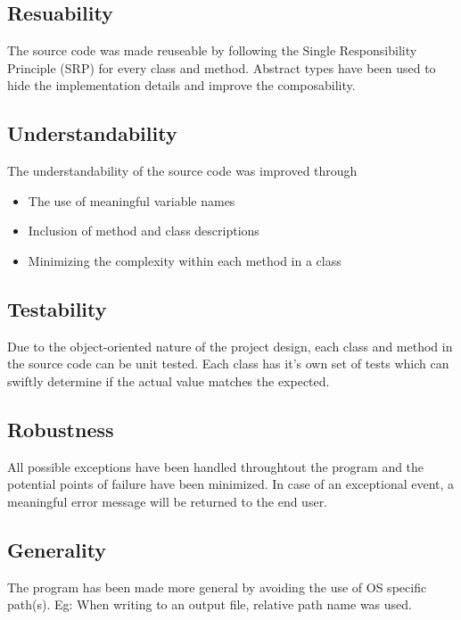   \subsection{Resuability}
    \begin{flushleft}
      The source code was made reuseable by following the Single Responsibility Principle (SRP) for every class and method. Abstract types have been used to hide the implementation details and improve the composability.
    \end{flushleft}

  \subsection{Understandability}
    \begin{flushleft}
      The understandability of the source code was improved through
      \begin{itemize}
        \item {The use of meaningful variable names}
        \item {Inclusion of method and class descriptions}
        \item {Minimizing the complexity within each method in a class}
      \end{itemize}
    \end{flushleft}

  \subsection{Testability}
    \begin{flushleft}
      Due to the object-oriented nature of the project design, each class and method in the source code can be unit tested. Each class has it's own set of tests which can swiftly determine if the actual value matches the expected.
    \end{flushleft}

  \subsection{Robustness}
  \begin{flushleft}
    All possible exceptions have been handled throughtout the program and the potential points of failure have been minimized. In case of an exceptional event, a meaningful error message will be returned to the end user.
  \end{flushleft}

  \subsection{Generality}
    \begin{flushleft}
      The program has been made more general by avoiding the use of OS specific path(s). Eg: When writing to an output file, relative path name was used.
    \end{flushleft}

